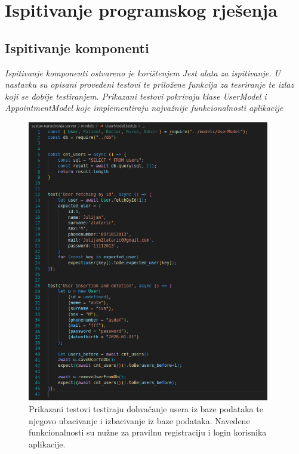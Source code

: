 			
			
			\eject 
		

		\section{Ispitivanje programskog rješenja}
	
			
			\subsection{Ispitivanje komponenti}
			\textit{Ispitivanje komponenti ostvareno je korištenjem Jest alata za ispitivanje. U nastavku su opisani provedeni testovi te priložene funkcija za tesriranje te izlaz koji se dobije testiranjem. Prikazani testovi pokrivaju klase UserModel i AppointmentModel koje implementiraju najvažnije funkcionalnosti aplikacije
                    }
    
            \begin{figure}[H]
                    \includegraphics[width=300pt]{slike/usermodel_tests_code.png} %
                    \caption{Prikazani testovi testiraju dohvačanje usera iz baze podataka te njegovo ubacivanje i izbacivanje iz baze podataka. Navedene funkcionalnosti su nužne za pravilnu registraciju i login korisnika aplikacije.}
                    \label{fig:struktura} %
                \end{figure}

